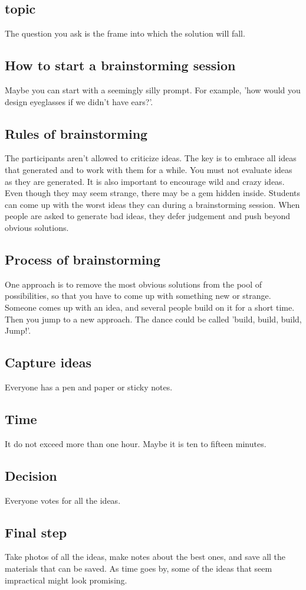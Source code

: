 \subsection{topic}
The question you ask is the frame into which the solution will fall.
\subsection{How to start a brainstorming session}
Maybe you can start with a seemingly silly prompt. For example, 'how would you design eyeglasses if we didn't have ears?'.
\subsection{Rules of brainstorming}
The participants aren't allowed to criticize ideas.
The key is to embrace all ideas that generated and to work with them for a while.
You must not evaluate ideas as they are generated.
It is also important to encourage wild and crazy ideas.
Even though they may seem strange, there may be a gem hidden inside.
Students can come up with the worst ideas they can during a brainstorming session.
When people are asked to generate bad ideas, they defer judgement and push beyond obvious solutions.
\subsection{Process of brainstorming}
One approach is to remove the most obvious solutions from the pool of possibilities, so that you have to come up with something new or strange.
Someone comes up with an idea, and several people build on it for a short time.
Then you jump to a new approach. 
The dance could be called 'build, build, build, Jump!'.
\subsection{Capture ideas}
Everyone has a pen and paper or sticky notes.
\subsection{Time}
It do not exceed more than one hour.
Maybe it is ten to fifteen minutes.
\subsection{Decision}
Everyone votes for all the ideas.

\subsection{Final step}
Take photos of all the ideas, make notes about the best ones, and save all the materials that can be saved.
As time goes by, some of the ideas that seem impractical might look promising.

